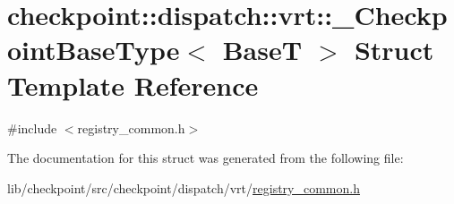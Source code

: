 \hypertarget{structcheckpoint_1_1dispatch_1_1vrt_1_1___checkpoint_base_type}{}\section{checkpoint\+:\+:dispatch\+:\+:vrt\+:\+:\+\_\+\+Checkpoint\+Base\+Type$<$ BaseT $>$ Struct Template Reference}
\label{structcheckpoint_1_1dispatch_1_1vrt_1_1___checkpoint_base_type}


{\ttfamily \#include $<$registry\+\_\+common.\+h$>$}



The documentation for this struct was generated from the following file\+:\begin{DoxyCompactItemize}
\item 
lib/checkpoint/src/checkpoint/dispatch/vrt/\hyperlink{registry__common_8h}{registry\+\_\+common.\+h}\end{DoxyCompactItemize}
